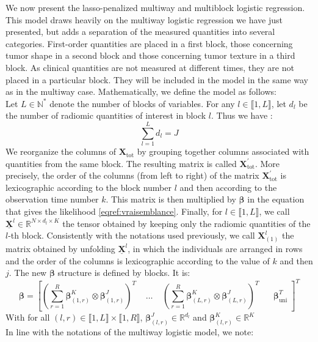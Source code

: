 \documentclass[10pt]{article}
\begin{document}
We now present the lasso-penalized multiway and multiblock logistic regression. This model draws heavily on the multiway logistic regression we have just presented, but adds a separation of the measured quantities into several categories. First-order quantities are placed in a first block, those concerning tumor shape in a second block and those concerning tumor texture in a third block. As clinical quantities are not measured at different times, they are not placed in a particular block. They will be included in the model in the same way as in the multiway case. Mathematically, we define the model as follows:\\
\indent Let $L \in \mathbb{N}^{*}$ denote the number of blocks of variables. For any $l \in \llbracket 1, L \rrbracket$, let $d_l$ be the number of radiomic quantities of interest in block $l$. Thus we have :
$$\sum\limits_{l = 1}^L d_l = J$$
We reorganize the columns of $\mathbf{X}_{\text{tot}}$ by grouping together columns associated with quantities from the same block. The resulting matrix is called $\mathbf{X}_{\text{tot}}^{'}$. More precisely, the order of the columns (from left to right) of the matrix $\mathbf{X}_{\text{tot}}^{'}$ is lexicographic according to the block number $l$ and then according to the observation time number $k$. This matrix is then multiplied by $\bm{\beta}$ in the equation that gives the likelihood \eqref{eqref:vraisemblance}. Finally, for $l \in \llbracket 1, L \rrbracket$, we call $\underline{\mathbf{X}}^l \in \mathbb{R}^{N \times d_l \times K}$ the tensor obtained by keeping only the radiomic quantities of the $l$-th block. Consistently with the notations used previously, we call $\mathbf{X}_{(1)}^l$ the matrix obtained by unfolding $\underline{\mathbf{X}}^l$, in which the individuals are arranged in rows and the order of the columns is lexicographic according to the value of $k$ and then $j$.
The new $\bm{\beta}$ structure is defined by blocks. It is:
\begin{equation}
\bm{\beta} = \left[ \left(\sum\limits_{r = 1}^R \bm{\beta}_{(1,r)}^K \otimes \bm{\beta}_{(1,r)}^J \right)^T \; \; \; \; \hdots \; \; \; \;  \left(\sum\limits_{r = 1}^R \bm{\beta}_{(L,r)}^K \otimes \bm{\beta}_{(L,r)}^J \right)^T \; \; \; \; \; \;\bm{\beta}_{\text{uni}}^T  \; \right]^T
\end{equation}
With for all $(l,r) \in \llbracket 1,L \rrbracket \times \llbracket 1, R\rrbracket$, $\bm{\beta}_{(l,r)}^J \in \mathbb{R}^{d_l}$ and $\bm{\beta}_{(l,r)}^K \in \mathbb{R}^{K}$  \\
In line with the notations of the multiway logistic model, we note:
\end{document}
